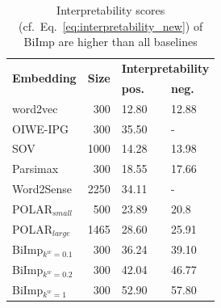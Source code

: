 \documentclass[11pt,a4paper]{article}
\def\proposedmethod{BiImp}
\begin{document}

\begin{table}
    \centering
	\begin{tabular}{lrll}
	    \hline \hline
        \multirow{2}{*}{\textbf{Embedding}} & \multirow{2}{*}{\textbf{Size}} &  \multicolumn{2}{c}{\textbf{Interpretability}}\\
                 & & \textbf{pos.} & \textbf{neg.} \\\hline \hline %
        word2vec & 300 & 12.80 & 12.88 \\
        OIWE-IPG & 300 & 35.50 & - \\
        SOV & 1000 & 14.28 & 13.98 \\
        Parsimax & 300 & 18.55 & 17.66\\
        Word2Sense & 2250 & 34.11 & -\\
        POLAR$_{small}$ & 500 & 23.89 & 20.8\\
        POLAR$_{large}$ & 1465 & 28.60 & 25.91\\
        \proposedmethod{}$_{k^w = 0.1}$ & 300 & 36.24 & 39.10\\
        \proposedmethod{}$_{k^w = 0.2}$ & 300 & 42.04 & 46.77\\
        \proposedmethod{}$_{k^w = 1}$ & 300 & 52.90 & 57.80\\
        \hline \hline
	\end{tabular}
	\caption{Interpretability scores 
          (cf.\ Eq.\ \ref{eq:interpretability_new})
          of \proposedmethod{} 
          are higher than all baselines}
	\label{tab:interp_results}
\end{table}
\end{document}
